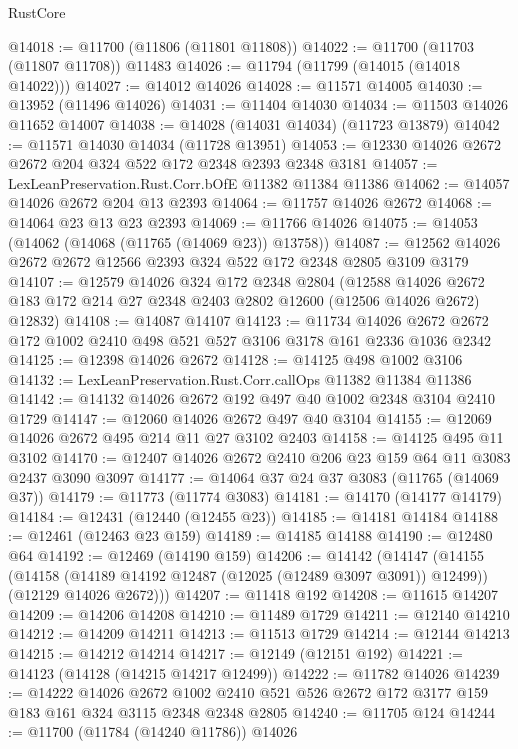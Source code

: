 \begin{lexlean}{RustCore}
\begin{coremodule}
@14018 := @11700 (@11806 (@11801 @11808))
@14022 := @11700 (@11703 (@11807 @11708)) @11483
@14026 := @11794 (@11799 (@14015 (@14018 @14022)))
@14027 := @14012 @14026
@14028 := @11571 @14005
@14030 := @13952 (@11496 @14026)
@14031 := @11404 @14030
@14034 := @11503 @14026 @11652 @14007
@14038 := @14028 (@14031 @14034) (@11723 @13879)
@14042 := @11571 @14030 @14034 (@11728 @13951)
@14053 := @12330 @14026 @2672 @2672 @204 @324 @522 @172 @2348 @2393 @2348 @3181
@14057 := LexLeanPreservation.Rust.Corr.bOfE @11382 @11384 @11386
@14062 := @14057 @14026 @2672 @204 @13 @2393
@14064 := @11757 @14026 @2672
@14068 := @14064 @23 @13 @23 @2393
@14069 := @11766 @14026
@14075 := @14053 (@14062 (@14068 (@11765 (@14069 @23)) @13758))
@14087 := @12562 @14026 @2672 @2672 @12566 @2393 @324 @522 @172 @2348 @2805 @3109 @3179
@14107 := @12579
    @14026
    @324
    @172
    @2348
    @2804
    (@12588 @14026 @2672 @183 @172 @214 @27 @2348 @2403 @2802 @12600 (@12506 @14026 @2672) @12832)
@14108 := @14087 @14107
@14123 := @11734
    @14026
    @2672
    @2672
    @172
    @1002
    @2410
    @498
    @521
    @527
    @3106
    @3178
    @161
    @2336
    @1036
    @2342
@14125 := @12398 @14026 @2672
@14128 := @14125 @498 @1002 @3106
@14132 := LexLeanPreservation.Rust.Corr.callOps @11382 @11384 @11386
@14142 := @14132 @14026 @2672 @192 @497 @40 @1002 @2348 @3104 @2410 @1729
@14147 := @12060 @14026 @2672 @497 @40 @3104
@14155 := @12069 @14026 @2672 @495 @214 @11 @27 @3102 @2403
@14158 := @14125 @495 @11 @3102
@14170 := @12407 @14026 @2672 @2410 @206 @23 @159 @64 @11 @3083 @2437 @3090 @3097
@14177 := @14064 @37 @24 @37 @3083 (@11765 (@14069 @37))
@14179 := @11773 (@11774 @3083)
@14181 := @14170 (@14177 @14179)
@14184 := @12431 (@12440 (@12455 @23))
@14185 := @14181 @14184
@14188 := @12461 (@12463 @23 @159)
@14189 := @14185 @14188
@14190 := @12480 @64
@14192 := @12469 (@14190 @159)
@14206 := @14142
    (@14147
      (@14155
        (@14158 (@14189 @14192 @12487 (@12025 (@12489 @3097 @3091)) @12499))
        (@12129 @14026 @2672)))
@14207 := @11418 @192
@14208 := @11615 @14207
@14209 := @14206 @14208
@14210 := @11489 @1729
@14211 := @12140 @14210
@14212 := @14209 @14211
@14213 := @11513 @1729
@14214 := @12144 @14213
@14215 := @14212 @14214
@14217 := @12149 (@12151 @192)
@14221 := @14123 (@14128 (@14215 @14217 @12499))
@14222 := @11782 @14026
@14239 := @14222
    @14026
    @2672
    @1002
    @2410
    @521
    @526
    @2672
    @172
    @3177
    @159
    @183
    @161
    @324
    @3115
    @2348
    @2348
    @2805
@14240 := @11705 @124
@14244 := @11700 (@11784 (@14240 @11786)) @14026

\end{coremodule}
\end{lexlean}
